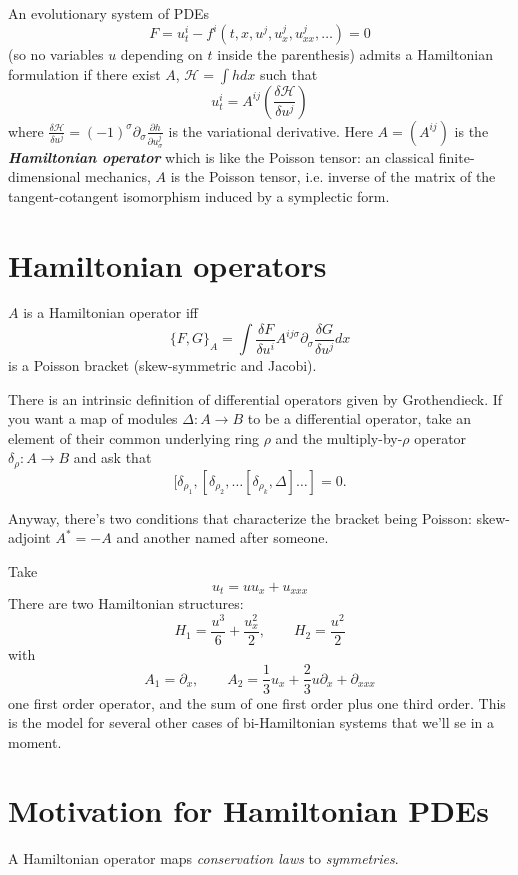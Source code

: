 An evolutionary system of PDEs
 \[F=u^i_t-f^i(t,x,u^j,u^j_x,u^j_{xx},\ldots)=0\]
 {\color{4}(so no variables $u$ depending on $t$ inside the parenthesis)} admits a Hamiltonian formulation if there exist $A$, $\mathcal{H}=\int h dx$ such that
 \[u^i_t=A^{ij}\left( \frac{\delta \mathcal{H}}{\delta u^j} \right)\]   where $ \frac{\delta \mathcal{H}}{\delta u^j}=(-1)^\sigma\partial_\sigma\frac{\partial h}{\partial u^j_\sigma}$ is the variational derivative. Here $A=(A^{ij})$ is the \textit{\textbf{Hamiltonian operator}} which is like the Poisson tensor: {\color{4}an classical finite-dimensional mechanics, $A$ is the Poisson tensor, i.e. inverse of the matrix of the tangent-cotangent isomorphism induced by a symplectic form.}
 
\section{Hamiltonian operators}
$A$ is a Hamiltonian operator iff
\[\{F,G\}_A=\int \frac{\delta F}{\delta u^i}A^{ij\sigma} \partial_{\sigma}\frac{\delta G}{\delta u^j}dx\]
is a Poisson bracket (skew-symmetric and Jacobi).

\begin{remark}\leavevmode
	There is an intrinsic definition of differential operators given by Grothendieck. If you want a map of modules $\Delta:A\to B$ to be a differential operator, take an element of their common underlying ring $\rho$ and the multiply-by-$\rho$ operator $\delta_\rho:A \to B$ and ask that
	\[[\delta_{\rho_1},[\delta_{\rho_2},\ldots [\delta_{\rho_k},\Delta]\ldots]=0.\]
	
\end{remark}

Anyway, there's two conditions that characterize the bracket being Poisson: skew-adjoint $A^*=-A$ and another named after someone.


\begin{example} \leavevmode
	Take
	\[u_t=u u_x+u_{x x x}\]
There are two Hamiltonian structures:
\[H_1=\frac{u^3}{6}+\frac{u^2_x}{2},\qquad H_2=\frac{u^2}{2}\]
with 
 \[A_1=\partial_x,\qquad  A_2=\frac{1}{3}u_x	+\frac{2}{3}u\partial_x+\partial_{x x x}\]
one first order operator, and the sum of one first order plus one third order. This is the model for several other cases of bi-Hamiltonian systems that we'll se in a moment.
\end{example}


\section{Motivation for Hamiltonian PDEs}
A Hamiltonian operator maps \textit{conservation laws}  to \textit{symmetries}.


